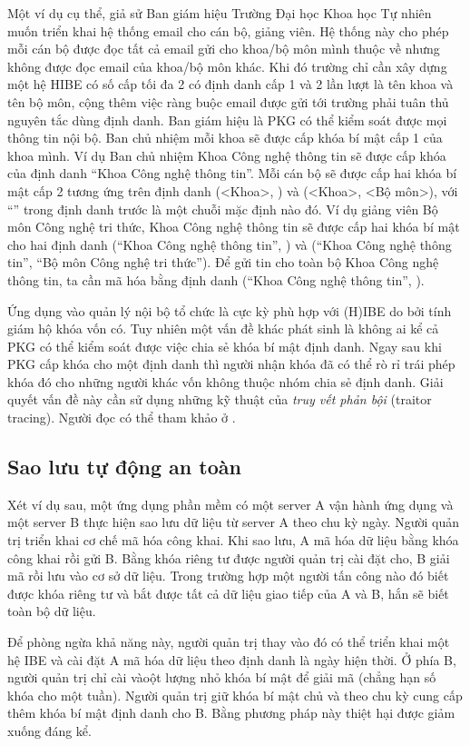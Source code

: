 \documentclass[class=report, crop=false]{standalone}
\begin{document}
			Một ví dụ cụ thể, giả sử Ban giám hiệu Trường Đại học Khoa học Tự nhiên muốn triển khai hệ thống email cho cán bộ, giảng viên. Hệ thống này cho phép mỗi cán bộ được đọc tất cả email gửi cho khoa/bộ môn mình thuộc về nhưng không được đọc email của khoa/bộ môn khác. Khi đó trường chỉ cần xây dựng một hệ HIBE có số cấp tối đa 2 có định danh cấp 1 và 2 lần lượt là tên khoa và tên bộ môn, cộng thêm việc ràng buộc email được gửi tới trường phải tuân thủ nguyên tắc dùng định danh. Ban giám hiệu là PKG có thể kiểm soát được mọi thông tin nội bộ. Ban chủ nhiệm mỗi khoa sẽ được cấp khóa bí mật cấp 1 của khoa mình. Ví dụ Ban chủ nhiệm Khoa Công nghệ thông tin sẽ được cấp khóa của định danh ``Khoa Công nghệ thông tin''. Mỗi cán bộ sẽ được cấp hai khóa bí mật cấp 2 tương ứng trên định danh (<Khoa>, \textunderscore) và (<Khoa>, <Bộ môn>), với ``\textunderscore'' trong định danh trước là một chuỗi mặc định nào đó. Ví dụ giảng viên Bộ môn Công nghệ tri thức, Khoa Công nghệ thông tin sẽ được cấp hai khóa bí mật cho hai định danh (``Khoa Công nghệ thông tin'', \textunderscore) và (``Khoa Công nghệ thông tin'', ``Bộ môn Công nghệ tri thức''). Để gửi tin cho toàn bộ Khoa Công nghệ thông tin, ta cần mã hóa bằng định danh (``Khoa Công nghệ thông tin'', \textunderscore).

			Ứng dụng vào quản lý nội bộ tổ chức là cực kỳ phù hợp với (H)IBE do bởi tính giám hộ khóa vốn có. Tuy nhiên một vấn đề khác phát sinh là không ai kể cả PKG có thể kiểm soát được việc chia sẻ khóa bí mật định danh. Ngay sau khi PKG cấp khóa cho một định danh thì người nhận khóa đã có thể rò rỉ trái phép khóa đó cho những người khác vốn không thuộc nhóm chia sẻ định danh. Giải quyết vấn đề này cần sử dụng những kỹ thuật của \textit{truy vết phản bội} (traitor tracing). Người đọc có thể tham khảo ở \cite{DBLP:conf/pkc/AbdallaDMNPS07}.
		\subsection{Sao lưu tự động an toàn}
			Xét ví dụ sau, một ứng dụng phần mềm có một server A vận hành ứng dụng và một server B thực hiện sao lưu dữ liệu từ server A theo chu kỳ ngày. Người quản trị triển khai cơ chế mã hóa công khai. Khi sao lưu, A mã hóa dữ liệu bằng khóa công khai rồi gửi B. Bằng khóa riêng tư được người quản trị cài đặt cho, B giải mã rồi lưu vào cơ sở dữ liệu. Trong trường hợp một người tấn công nào đó biết được khóa riêng tư và bắt được tất cả dữ liệu giao tiếp của A và B, hắn sẽ biết toàn bộ dữ liệu.
			
			Để phòng ngừa khả năng này, người quản trị thay vào đó có thể triển khai một hệ IBE và cài đặt A mã hóa dữ liệu theo định danh là ngày hiện thời. Ở phía B, người quản trị chỉ cài vàoột lượng nhỏ khóa bí mật để giải mã (chẳng hạn số khóa cho một tuần). Người quản trị giữ khóa bí mật chủ và theo chu kỳ cung cấp thêm khóa bí mật định danh cho B. Bằng phương pháp này thiệt hại được giảm xuống đáng kể.
\end{document}
